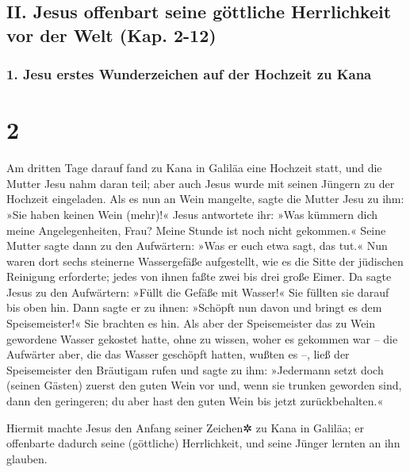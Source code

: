 \hypertarget{ii.-jesus-offenbart-seine-guxf6ttliche-herrlichkeit-vor-der-welt-kap.-2-12}{%
\subsection{II. Jesus offenbart seine göttliche Herrlichkeit vor der
Welt (Kap.
2-12)}\label{ii.-jesus-offenbart-seine-guxf6ttliche-herrlichkeit-vor-der-welt-kap.-2-12}}

\hypertarget{jesu-erstes-wunderzeichen-auf-der-hochzeit-zu-kana}{%
\subsubsection{1. Jesu erstes Wunderzeichen auf der Hochzeit zu
Kana}\label{jesu-erstes-wunderzeichen-auf-der-hochzeit-zu-kana}}

\hypertarget{section-1}{%
\section{2}\label{section-1}}

 Am dritten Tage darauf fand zu Kana in Galiläa eine
Hochzeit statt, und die Mutter Jesu nahm daran teil;  aber
auch Jesus wurde mit seinen Jüngern zu der Hochzeit eingeladen.
 Als es nun an Wein mangelte, sagte die Mutter Jesu zu
ihm: »Sie haben keinen Wein (mehr)!«  Jesus antwortete
ihr: »Was kümmern dich meine Angelegenheiten, Frau? Meine Stunde ist
noch nicht gekommen.«  Seine Mutter sagte dann zu den
Aufwärtern: »Was er euch etwa sagt, das tut.«  Nun waren
dort sechs steinerne Wassergefäße aufgestellt, wie es die Sitte der
jüdischen Reinigung erforderte; jedes von ihnen faßte zwei bis drei
große Eimer.  Da sagte Jesus zu den Aufwärtern: »Füllt die
Gefäße mit Wasser!« Sie füllten sie darauf bis oben hin. 
Dann sagte er zu ihnen: »Schöpft nun davon und bringt es dem
Speisemeister!« Sie brachten es hin.  Als aber der
Speisemeister das zu Wein gewordene Wasser gekostet hatte, ohne zu
wissen, woher es gekommen war -- die Aufwärter aber, die das Wasser
geschöpft hatten, wußten es --, ließ der Speisemeister den Bräutigam
rufen  und sagte zu ihm: »Jedermann setzt doch (seinen
Gästen) zuerst den guten Wein vor und, wenn sie trunken geworden sind,
dann den geringeren; du aber hast den guten Wein bis jetzt
zurückbehalten.«

 Hiermit machte Jesus den Anfang seiner Zeichen✲ zu Kana
in Galiläa; er offenbarte dadurch seine (göttliche) Herrlichkeit, und
seine Jünger lernten an ihn glauben.

